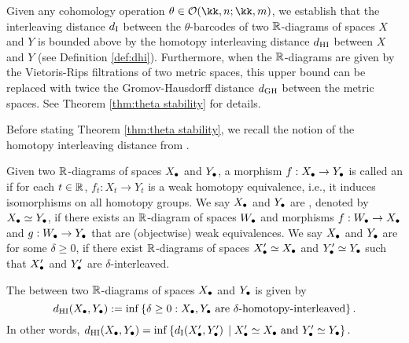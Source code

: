 Given any cohomology operation $\theta \in \cO(\kk, n; \kk, m)$, we establish that the interleaving distance $d_{\mathrm{I}}$ between the $\theta$-barcodes of two $\mathbb{R}$-diagrams of spaces $X$ and $Y$ is bounded above by the homotopy interleaving distance $d_{\mathrm{HI}}$ between $X$ and $Y$ (see Definition \ref{def:dhi}). Furthermore, when the $\mathbb{R}$-diagrams are given by the Vietoris-Rips filtrations of two metric spaces, this upper bound can be replaced with twice the Gromov-Hausdorff distance $d_{\mathrm{GH}}$ between the metric spaces. See Theorem \ref{thm:theta stability} for details.


Before stating Theorem \ref{thm:theta stability}, we recall the notion of the homotopy interleaving distance from \cite{blumberg2023universality} . 

Given two $\mathbb{R}$-diagrams of spaces $X_\bullet$ and $Y_\bullet$, a morphism $f:X_\bullet\to Y_\bullet$ is called an  if for each $t\in \mathbb{R}$, $f_t:X_t\to Y_t$ is a weak homotopy equivalence, i.e., it induces isomorphisms on all homotopy groups.
We say $X_\bullet$ and $Y_\bullet$ are , denoted by $X_\bullet\simeq Y_\bullet$, if there exists an $\mathbb{R}$-diagram of spaces $W_\bullet$ and morphisms $f:W_\bullet\to X_\bullet$ and $g:W_\bullet\to Y_\bullet$ that are (objectwise) weak equivalences.
We say $X_\bullet$ and $Y_\bullet$ are  for some $\delta\geq 0$, if there exist $\mathbb{R}$-diagrams of spaces $X_\bullet'\simeq X_\bullet$ and $Y_\bullet'\simeq Y_\bullet$ such that $X_\bullet'$ and $Y_\bullet'$ are $\delta$-interleaved. \label{para:weakly equivalent}

\begin{definition} \label{def:dhi} The  between two $\mathbb{R}$-diagrams of spaces $X_\bullet$ and $Y_\bullet$ is given by
	$$d_{\mathrm{HI}}(X_\bullet,Y_\bullet):=\inf \left\{\delta\geq 0:X_\bullet,Y_\bullet \text{ are }\delta\text{-homotopy-interleaved}\right\}.$$
In other words, $d_{\mathrm{HI}}(X_\bullet,Y_\bullet)=\inf\left\{d_{\mathrm{I}}(X_\bullet',Y_\bullet')\,\mid X_\bullet'\simeq X_\bullet\text{ and }Y_\bullet'\simeq Y_\bullet\right\}.$
\end{definition}

